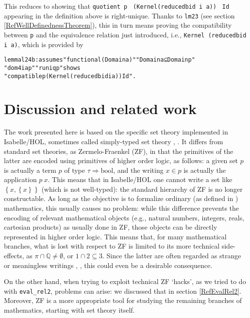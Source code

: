 \documentclass[
]{llncs}
\newenvironment{mytable}{
\vspace{0.2ex}
\begin{center}\begin{minipage}
{0.9\textwidth}\renewcommand{\baselinestretch}{0.75}\begin{small}}
{\end{small}\end{minipage}\end{center}
\vspace{0.1ex}
}
\newcommand{\hol}{higher order logic}
\newcommand{\Hol}{HOL}
\newcommand{\I}{Isabelle}
\begin{document}
This reduces to showing that 
\verb|quotient p |
\verb|(Kernel(reducedbid i a))|
\verb| Id| appearing in the definition above is right-unique. 
Thanks to \verb|lm23| (see section \ref{RefWellDefinednessTheorem}), this in turn means proving the compatibility between \verb|p| and the equivalence relation just introduced, i.e., \verb|Kernel (reducedbid i a)|, 
which is provided by 
\begin{mytable}
\begin{alltt}
lemma l24b: assumes "functional (Domain a)" "Domain a ⊆ Domain p" 
"dom4 i a p" "runiq p" shows 
"compatible p (Kernel (reducedbid i a)) Id".
\end{alltt}
\end{mytable}

\section{Discussion and related work}
\label{RefSetTheory}
\label{RefRelatedWork}
The work presented here is based on the specific set theory implemented in \I{}/HOL, sometimes called simply-typed set theory \cite[Section~6.1]{paulson2013proof}, \cite[Section~1]{Paulson:stfv93}.
It differs from standard set theories, as Zermelo-Fraenkel (ZF), in that the primitives of the latter are encoded using primitives of \hol{}, as follows: a given set $p$ is actually a term $p$ of type $\tau \Rightarrow \text{bool}$, and the writing $x \in p$ is actually the application $p\ x$.
This means that in \I/\Hol{} one cannot write a set like $ \left\{ x, \left\{ x \right\} \right\}$ (which is not well-typed): the standard hierarchy of ZF is no longer constructable.
As long as the objective is to formalize ordinary 
(as defined in \cite[Section~I.1]{simpson2009subsystems}) mathematics, this usually causes no problem:
while this difference prevents the encoding of relevant mathematical objects (e.g., natural numbers, integers, reals, cartesian products) as usually done in ZF, those objects can be directly represented in \hol{}.
This means that, for many mathematical branches, what is lost with respect to ZF is limited to its more technical side-effects, as $\pi \cap \mathbb{Q} \neq \emptyset$, or $1 \cap 2 \subseteq 3$.
Since the latter are often regarded as strange or meaningless writings \cite{leinster2012rethinking}, \cite[Section~1]{Paulson:stfv93}, this could even be a desirable consequence.

On the other hand, when trying to exploit technical ZF `hacks{}', as we tried to do with \verb|eval_rel2|, problems can arise: we discussed that in section \ref{RefEvalRel2}.
Moreover, ZF is a more appropriate tool for studying the remaining branches of mathematics, starting with set theory itself.
\end{document}

